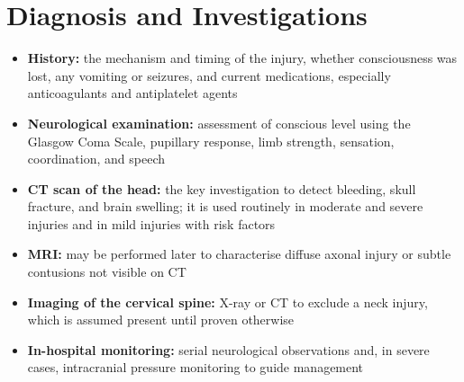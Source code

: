 \section*{Diagnosis and Investigations}
\begin{itemize}
    \item \textbf{History:} the mechanism and timing of the injury, whether consciousness was lost, any vomiting or seizures, and current medications, especially anticoagulants and antiplatelet agents
    \item \textbf{Neurological examination:} assessment of conscious level using the Glasgow Coma Scale, pupillary response, limb strength, sensation, coordination, and speech
    \item \textbf{CT scan of the head:} the key investigation to detect bleeding, skull fracture, and brain swelling; it is used routinely in moderate and severe injuries and in mild injuries with risk factors
    \item \textbf{MRI:} may be performed later to characterise diffuse axonal injury or subtle contusions not visible on CT
    \item \textbf{Imaging of the cervical spine:} X-ray or CT to exclude a neck injury, which is assumed present until proven otherwise
    \item \textbf{In-hospital monitoring:} serial neurological observations and, in severe cases, intracranial pressure monitoring to guide management
\end{itemize}

